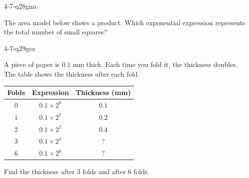 \begin{practiceQuestion}{4-7-q28}{gmc}
\begin{questionText}
The area model below shows a product. Which exponential expression represents the total number of small squares?

\begin{center}
\end{center}
\end{questionText}
\end{practiceQuestion}

\begin{practiceQuestion}{4-7-q29}{gsa}
\begin{questionText}
A piece of paper is $0.1$ mm thick. Each time you fold it, the thickness doubles. The table shows the thickness after each fold.

\begin{center}
\begin{tabular}{|c|c|c|}
\hline
\textbf{Folds} & \textbf{Expression} & \textbf{Thickness (mm)} \\
\hline
$0$ & $0.1 \times 2^0$ & $0.1$ \\
\hline
$1$ & $0.1 \times 2^1$ & $0.2$ \\
\hline
$2$ & $0.1 \times 2^2$ & $0.4$ \\
\hline
$3$ & $0.1 \times 2^3$ & ? \\
\hline
$6$ & $0.1 \times 2^6$ & ? \\
\hline
\end{tabular}
\end{center}

Find the thickness after $3$ folds and after $6$ folds.
\end{questionText}
\end{practiceQuestion}

